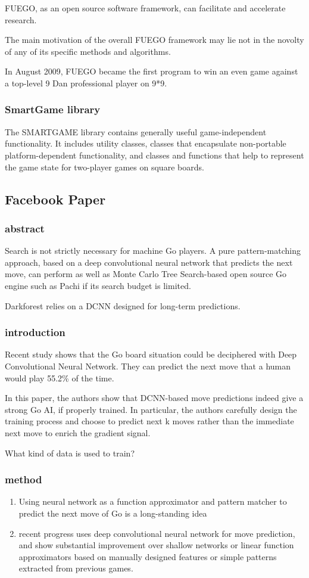 FUEGO, as an open source software framework, can facilitate and accelerate research. 

The main motivation of the overall FUEGO framework may lie not in the novolty of any of its specific methods and algorithms.

In August 2009, FUEGO became the first program to win an even game against a top-level 9 Dan professional player on 9*9.

\subsubsection{SmartGame library}
The SMARTGAME library contains generally useful game-independent functionality. It includes utility classes, classes that encapsulate non-portable platform-dependent functionality, and classes and functions that help to represent the game state for two-player games on square boards.

\subsection{Facebook Paper}
\subsubsection{abstract}
Search is not strictly necessary for machine Go players. A pure pattern-matching approach, based on a deep convolutional neural network that predicts the next move, can perform as well as Monte Carlo Tree Search-based open source Go engine such as Pachi if its search budget is limited.

Darkforest relies on a DCNN designed for long-term predictions.
\subsubsection{introduction}
Recent study shows that the Go board situation could be deciphered with Deep Convolutional Neural Network. They can predict the next move that a human would play 55.2\% of the time.

In this paper, the authors show that DCNN-based move predictions indeed give a strong Go AI, if properly trained. In particular, the authors carefully design the training process and choose to predict next k moves rather than the immediate next move to enrich the gradient signal.

What kind of data is used to train?
\subsubsection{method}
\begin{enumerate}
	\item Using neural network as a function approximator and pattern matcher to predict the next move of Go is a long-standing idea
	\item recent progress uses deep convolutional neural network for move prediction, and show substantial improvement over shallow networks or linear function approximators based on manually designed features or simple patterns extracted from previous games.
\end{enumerate}